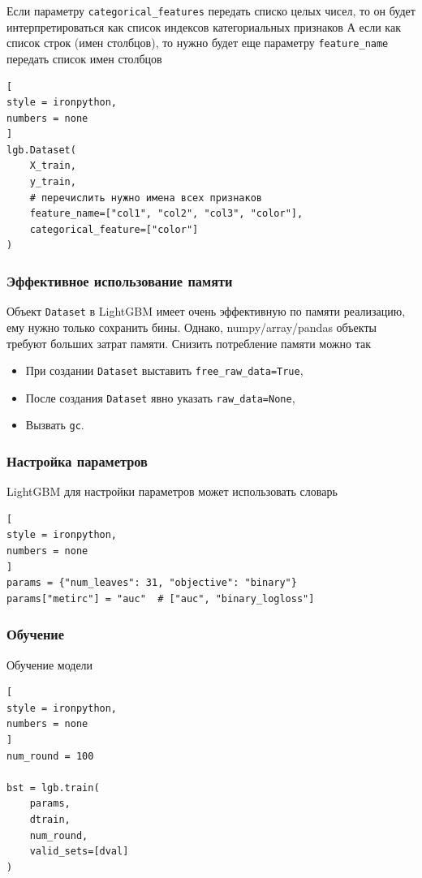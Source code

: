 \documentclass[%
	11pt,
	a4paper,
	utf8,
		]{article}
\begin{document}
Если параметру \verb|categorical_features| передать списко целых чисел, то он будет интерпретироваться как список индексов категориальных признаков А если как список строк (имен столбцов), то нужно будет еще параметру \verb|feature_name| передать список имен столбцов
\begin{lstlisting}[
style = ironpython,
numbers = none
]
lgb.Dataset(
    X_train,
    y_train,
    # перечислить нужно имена всех признаков
    feature_name=["col1", "col2", "col3", "color"],
    categorical_feature=["color"]
)
\end{lstlisting}

\subsubsection{Эффективное использование памяти}

Объект \verb|Dataset| в LightGBM имеет очень эффективную по памяти реализацию, ему нужно только сохранить бины. Однако, numpy/array/pandas объекты требуют больших затрат памяти. Снизить потребление памяти можно так
\begin{itemize}
	\item При создании \verb|Dataset| выставить \verb|free_raw_data=True|,
	
	\item После создания \verb|Dataset| явно указать \verb|raw_data=None|,
	
	\item Вызвать \verb|gc|.
\end{itemize}

\subsubsection{Настройка параметров}

LightGBM для настройки параметров может использовать словарь
\begin{lstlisting}[
style = ironpython,
numbers = none
]
params = {"num_leaves": 31, "objective": "binary"}
params["metirc"] = "auc"  # ["auc", "binary_logloss"]
\end{lstlisting}

\subsubsection{Обучение}

Обучение модели
\begin{lstlisting}[
style = ironpython,
numbers = none
]
num_round = 100

bst = lgb.train(
    params,
    dtrain,
    num_round,
    valid_sets=[dval]
)
\end{lstlisting}
\end{document}
